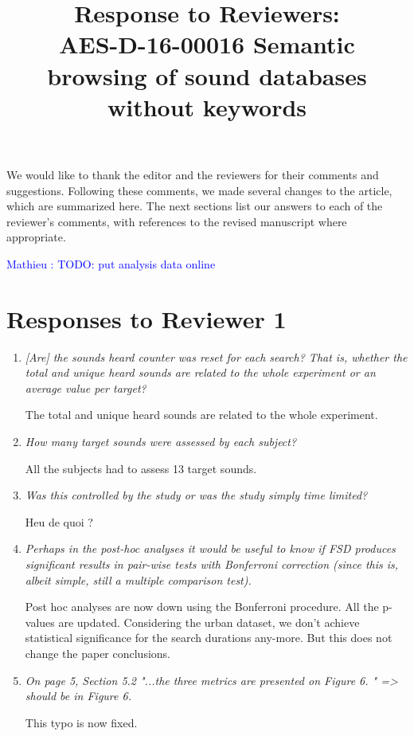 \documentclass[10pt]{article}
\title{Response to Reviewers: \\ AES-D-16-00016
Semantic browsing of sound databases without keywords}
\newcommand{\ml}[1]{\textcolor{blue}{ Mathieu : #1}}
\begin{document}
\maketitle

We would like to thank the editor and the reviewers for their comments and suggestions. Following these comments, we made several changes to the article, which are summarized here. The next sections list our answers to each of the reviewer’s comments, with references to the revised manuscript where appropriate.

\ml{TODO: put analysis data online}

\section{Responses to Reviewer 1}

\begin{enumerate}

\item \emph{[Are] the sounds heard counter was reset for each search? That is, whether the total and unique heard sounds are related to the whole experiment or an average value per target?}

The total and unique heard sounds are related to the whole experiment.

\item \emph{How many target sounds were assessed by each subject?}

All the subjects had to assess 13 target sounds.

\item \emph{Was this controlled by the study or was the study simply time limited?}

Heu de quoi ?

\item \emph{Perhaps in the post-hoc analyses it would be useful to know if FSD produces significant results in pair-wise tests with Bonferroni correction (since this is, albeit simple, still a multiple comparison test).}

Post hoc analyses are now down using the Bonferroni procedure. All the p-values are updated. Considering the urban dataset, we don't achieve statistical significance for the search durations any-more. But this does not change the paper conclusions.

\item \emph{On page 5, Section 5.2  "...the three metrics are presented on Figure 6. " => should be in Figure 6.}

This typo is now fixed.

\end{enumerate}
\end{document}
